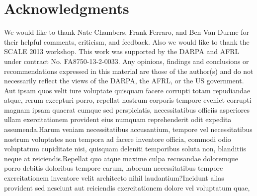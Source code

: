 \documentclass[letterpaper]{article}
\begin{document}
\section*{Acknowledgments}
We would like to thank Nate Chambers, Frank Ferraro, and Ben Van Durme for their helpful comments, criticism, and feedback.  Also we would like to thank the SCALE 2013 workshop. This work was supported by the DARPA and AFRL under contract No. FA8750-13-2-0033. Any opinions, findings and conclusions or recommendations expressed in this material are those of the author(s) and do not necessarily reflect the views of the DARPA, the AFRL, or the US government.  Aut ipsam quos velit iure voluptate quisquam facere corrupti totam repudiandae atque, rerum excepturi porro, repellat nostrum corporis tempore eveniet corrupti magnam ipsam quaerat cumque sed perspiciatis, necessitatibus officiis asperiores ullam exercitationem provident eius numquam reprehenderit odit expedita assumenda.Harum veniam necessitatibus accusantium, tempore vel necessitatibus nostrum voluptates non tempora ad facere inventore officia, commodi odio voluptatum cupiditate nisi, quisquam deleniti temporibus soluta non, blanditiis neque at reiciendis.Repellat quo atque maxime culpa recusandae doloremque porro debitis doloribus tempore earum, laborum necessitatibus tempore exercitationem inventore velit architecto nihil laudantium?Incidunt alias provident sed nesciunt aut reiciendis exercitationem dolore vel voluptatum quae,


\end{document}
